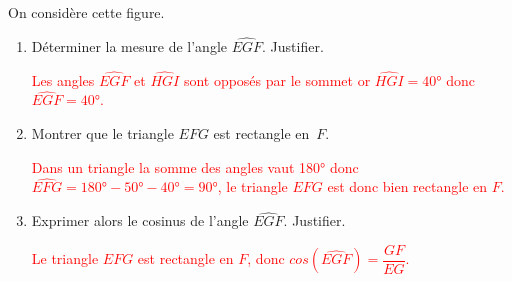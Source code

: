\begin{corrige}
    On considère cette figure.

    \begin{center}
    \end{center}    
    \begin{enumerate}
        \item Déterminer la mesure de l'angle $\widehat{EGF}$. Justifier.
        
        \textcolor{red}{Les angles $\widehat{EGF}$ et $\widehat{HGI}$ sont opposés par le sommet or $\widehat{HGI}=\ang{40}$ donc $\widehat{EGF}=\ang{40}$.}
        \item Montrer que le triangle $EFG$ est rectangle \mbox{en $F$}.
        
        \textcolor{red}{Dans un triangle la somme des angles vaut \ang{180} donc $\widehat{EFG}=\ang{180}-\ang{50}-\ang{40}=\ang{90}$, le triangle $EFG$ est donc bien rectangle en $F$.}
        \item Exprimer alors le cosinus de l'angle $\widehat{EGF}$. Justifier.
        
        \textcolor{red}{Le triangle $EFG$ est rectangle en $F$, donc $cos(\widehat{EGF})=\dfrac{GF}{EG}$.}
    \end{enumerate}
\end{corrige}

